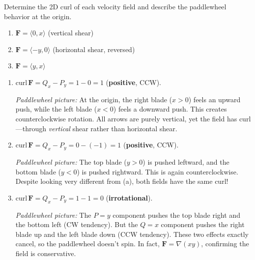 \exampleline
\begin{example}
Determine the 2D curl of each velocity field and describe the paddlewheel behavior at the origin.

\begin{enumerate}
    \item $\mathbf{F} = \langle 0, x \rangle$ \quad (vertical shear)
    \item $\mathbf{F} = \langle -y, 0 \rangle$ \quad (horizontal shear, reversed)
    \item $\mathbf{F} = \langle y, x \rangle$
\end{enumerate}

\begin{solution}
\begin{enumerate}
    \item $\text{curl}\,\mathbf{F} = Q_x - P_y = 1 - 0 = 1$ (\textbf{positive}, CCW).

    \textit{Paddlewheel picture:} At the origin, the right blade ($x > 0$) feels an upward push, while the left blade ($x < 0$) feels a downward push. This creates counterclockwise rotation. All arrows are purely vertical, yet the field has curl---through \textit{vertical} shear rather than horizontal shear.

    \item $\text{curl}\,\mathbf{F} = Q_x - P_y = 0 - (-1) = 1$ (\textbf{positive}, CCW).

    \textit{Paddlewheel picture:} The top blade ($y > 0$) is pushed leftward, and the bottom blade ($y < 0$) is pushed rightward. This is again counterclockwise. Despite looking very different from (a), both fields have the same curl!

    \item $\text{curl}\,\mathbf{F} = Q_x - P_y = 1 - 1 = 0$ (\textbf{irrotational}).

    \textit{Paddlewheel picture:} The $P = y$ component pushes the top blade right and the bottom left (CW tendency). But the $Q = x$ component pushes the right blade up and the left blade down (CCW tendency). These two effects exactly cancel, so the paddlewheel doesn't spin. In fact, $\mathbf{F} = \nabla(xy)$, confirming the field is conservative.
\end{enumerate}
\end{solution}
\end{example}
\exampleline

